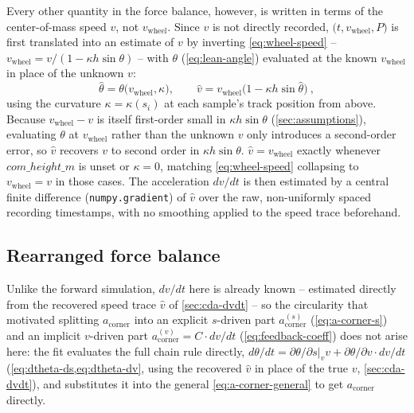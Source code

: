 Every other quantity in the force balance, however, is written in terms of the
center-of-mass speed $v$, not $v_{\mathrm{wheel}}$. Since $v$ is not directly
recorded, $\bigl(t, v_{\mathrm{wheel}}, P\bigr)$ is first
translated into an estimate of $v$ by inverting \cref{eq:wheel-speed} --
$v_{\mathrm{wheel}} = v/(1-\kappa h\sin\theta)$ -- with $\theta$ (\cref{eq:lean-angle}) evaluated at
the known $v_{\mathrm{wheel}}$ in place of the unknown $v$:
\begin{equation}
    \hat\theta = \theta\bigl(v_{\mathrm{wheel}}, \kappa\bigr), \qquad
    \hat v = v_{\mathrm{wheel}}\bigl(1 - \kappa h \sin\hat\theta\bigr)\ ,
    \label{eq:cda-v-correction}
\end{equation}
using the curvature $\kappa = \kappa(s_i)$ at each sample's track position from
above. Because $v_{\mathrm{wheel}} - v$ is itself first-order small in
$\kappa h \sin\theta$ (\cref{sec:assumptions}), evaluating $\theta$ at
$v_{\mathrm{wheel}}$ rather than the unknown $v$ only introduces a
second-order error, so $\hat v$ recovers $v$ to second order in
$\kappa h \sin\theta$. $\hat v = v_{\mathrm{wheel}}$ exactly whenever
$com\_height\_m$ is unset or $\kappa = 0$, matching \cref{eq:wheel-speed}
collapsing to $v_{\mathrm{wheel}} = v$ in those cases. The acceleration
$dv/dt$ is then estimated by a central finite difference
(\nolinkurl{numpy.gradient}) of $\hat v$ over the raw, non-uniformly spaced
recording timestamps, with no smoothing applied to the speed trace beforehand.

\subsection{Rearranged force balance}
\label{sec:cda-rearranged}

Unlike the forward simulation, $dv/dt$ here is already known -- estimated
directly from the recovered speed trace $\hat v$ of \cref{sec:cda-dvdt} -- so
the circularity that motivated splitting $a_{\mathrm{corner}}$ into an
explicit $s$-driven part $a_{\mathrm{corner}}^{(s)}$ (\cref{eq:a-corner-s})
and an implicit $v$-driven part $a_{\mathrm{corner}}^{(v)} = C \cdot dv/dt$
(\cref{eq:feedback-coeff}) does not arise here: the fit
evaluates the full chain rule directly,
$d\theta/dt = \left.\partial\theta/\partial s\right|_v v + \partial\theta/\partial v \cdot dv/dt$
(\cref{eq:dtheta-ds,eq:dtheta-dv}, using the recovered $\hat v$ in place of
the true $v$, \cref{sec:cda-dvdt}), and substitutes it into the general
\cref{eq:a-corner-general} to get $a_{\mathrm{corner}}$ directly.

